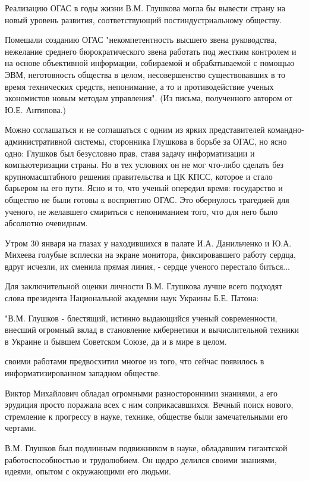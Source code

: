 Реализацию ОГАС в годы жизни В.М. Глушкова могла бы вывести страну на новый
уровень развития, соответствующий постиндустриальному обществу.

Помешали созданию ОГАС "некомпетентность высшего звена руководства, нежелание
среднего бюрократического звена работать под жестким контролем и на основе
объективной информации, собираемой и обрабатываемой с помощью ЭВМ, неготовность
общества в целом, несовершенство существовавших в то время технических средств,
непонимание, а то и противодействие ученых экономистов новым методам
управления". (Из письма, полученного автором от Ю.Е. Антипова.)

Можно соглашаться и не соглашаться с одним из ярких представителей
командно-административной системы, сторонника Глушкова в борьбе за ОГАС, но ясно
одно: Глушков был безусловно прав, ставя задачу информатизации и компьютеризации
страны. Но в тех условиях он не мог что-либо сделать без крупномасштабного
решения правительства и ЦК КПСС, которое и стало барьером на его пути. Ясно и
то, что ученый опередил время: государство и общество не были готовы к
восприятию ОГАС. Это обернулось трагедией для ученого, не желавшего смириться с
непониманием того, что для него было абсолютно очевидным.

Утром 30 января на глазах у находившихся в палате И.А. Данильченко и Ю.А.
Михеева голубые всплески на экране монитора, фиксировавшего работу сердца, вдруг
исчезли, их сменила прямая линия, - сердце ученого перестало биться...

Для заключительной оценки личности В.М. Глушкова лучше всего подходят слова
президента Национальной академии наук Украины Б.Е. Патона:

"В.М. Глушков - блестящий, истинно выдающийся ученый современности, внесший
огромный вклад в становление кибернетики и вычислительной техники в Украине и
бывшем Советском Союзе, да и в мире в целом.

своими работами предвосхитил многое из того, что сейчас появилось в
информатизированном западном обществе.

Виктор Михайлович обладал огромными разносторонними знаниями, а его эрудиция
просто поражала всех с ним соприкасавшихся. Вечный поиск нового, стремление к
прогрессу в науке, технике, обществе были замечательными его чертами.

В.М. Глушков был подлинным подвижником в науке, обладавшим гигантской
работоспособностью и трудолюбием. Он щедро делился своими знаниями, идеями,
опытом с окружающими его людьми.

